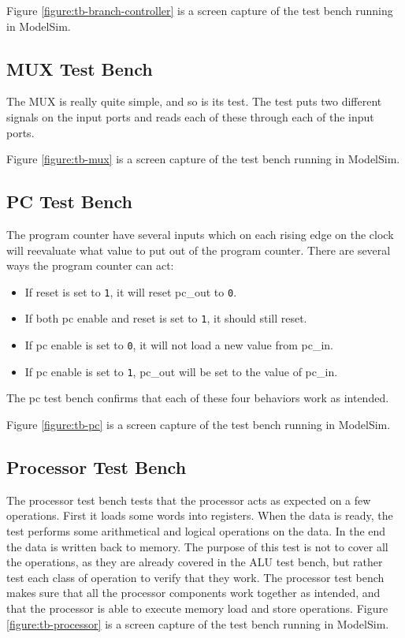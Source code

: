 Figure \vref{figure:tb-branch-controller} is a screen capture of the test bench running in ModelSim.

\subsection{MUX Test Bench}

The MUX is really quite simple, and so is its test.
The test puts two different signals on the input ports and reads each of these through each of the input ports.

Figure \vref{figure:tb-mux} is a screen capture of the test bench running in ModelSim.

\subsection{PC Test Bench}

The program counter have several inputs which on each rising edge on the clock will reevaluate what value to put out of the program counter.
There are several ways the program counter can act:
\begin{itemize}
\item{If reset is set to \texttt{1}, it will reset pc\_out to \texttt{0}.}
\item{If both pc enable and reset is set to \texttt{1}, it should still reset.}
\item{If pc enable is set to \texttt{0}, it will not load a new value from pc\_in.}
\item{If pc enable is set to \texttt{1}, pc\_out will be set to the value of pc\_in.}
\end{itemize}
The pc test bench confirms that each of these four behaviors work as intended.

Figure \vref{figure:tb-pc} is a screen capture of the test bench running in ModelSim.


\subsection{Processor Test Bench}

The processor test bench tests that the processor acts as expected on a few operations.
First it loads some words into registers.
When the data is ready, the test performs some arithmetical and logical operations on the data.
In the end the data is written back to memory.
The purpose of this test is not to cover all the operations, as they are already covered in the ALU test bench, but rather test each class of operation to verify that they work.
The processor test bench makes sure that all the processor components work together as intended, and that the processor is able to execute memory load and store operations.
Figure \vref{figure:tb-processor} is a screen capture of the test bench running in ModelSim.


